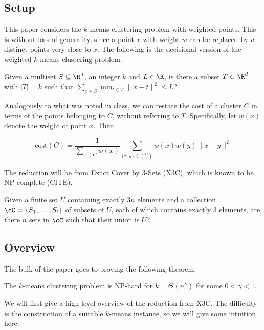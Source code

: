 \subsection{Setup}

This paper considers the $k$-means clustering problem with weighted points. This is without loss of generality, since a point $x$ with weight $w$ can be replaced by $w$ distinct points very close to $x$. The following is the decisional version of the weighted $k$-means clustering problem.\\

\begin{definition}
    Given a multiset $S\subseteq \R^d$, an integer $k$ and $L\in\R$, is there a subset $T\subset\R^d$ with $|T|=k$ such that $\sum_{x\in S}\min_{t\in T}\|x-t\|^2\le L$?
\end{definition}

Analogously to what was noted in class, we can restate the cost of a cluster $C$ in terms of the points belonging to $C$, without referring to $T$. Specifically, let $w(x)$ denote the weight of point $x$. Then

$$\text{cost}(C)=\frac{1}{\sum_{x\in C} w(x)}\sum_{\{x,y\}\in\binom{C}{2}}w(x)w(y)\|x-y\|^2$$

The reduction will be from Exact Cover by 3-Sets (X3C), which is known to be NP-complete (CITE).\\

\begin{definition}
    Given a finite set $U$ containing exactly $3n$ elements and a collection $\cC=\{S_1,\dots,S_l\}$ of subsets of $U$, each of which contains exactly 3 elements, are there $n$ sets in $\cC$ such that their union is $U$?
\end{definition}

\subsection{Overview}

The bulk of the paper goes to proving the following theorem.\\

\begin{theorem}
The $k$-means clustering problem is NP-hard for $k=\Theta(n^\gamma)$ for some $0<\gamma<1$.
\end{theorem}

We will first give a high level overview of the reduction from X3C. The difficulty is the construction of a suitable $k$-means instance, so we will give some intuition here.

